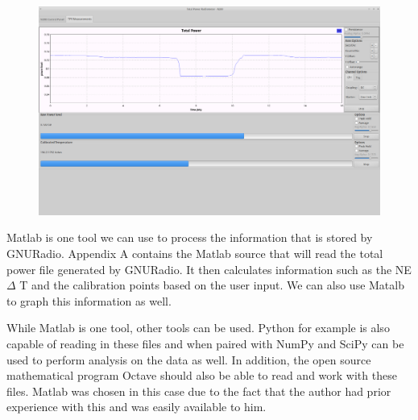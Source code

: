 {\begin{figure}[h!tb] 
\centering
\includegraphics[width=17cm]{Images/Lab1_TPR_at_end_exp.png}
\label{radiometer_tpr_display}
\end{figure}
}

Matlab is one tool we can use to process the information that is stored by GNURadio.  Appendix A contains the Matlab source that will read the total power file generated by GNURadio.  It then calculates information such as the NE $\Delta$ T and the calibration points based on the user input.  We can also use Matalb to graph this information as well.

While Matlab is one tool, other tools can be used.  Python for example is also capable of reading in these files and when paired with NumPy and SciPy can be used to perform analysis on the data as well.  In addition, the open source mathematical program Octave should also be able to read and work with these files.  Matlab was chosen in this case due to the fact that the author had prior experience with this and was easily available to him.  





